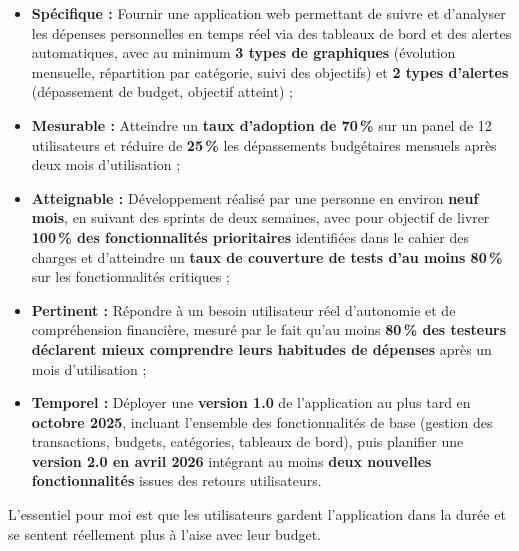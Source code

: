 \begin{tcolorbox}[colback=green!5!white,colframe=green!60!black,title=\textbf{Objectifs SMART du projet avec indicateurs de mesure}]
\begin{itemize}
    \item \textbf{Spécifique :} Fournir une application web permettant de suivre et d'analyser les dépenses personnelles en temps réel via des tableaux de bord et des alertes automatiques, avec au minimum \textbf{3 types de graphiques} (évolution mensuelle, répartition par catégorie, suivi des objectifs) et \textbf{2 types d'alertes} (dépassement de budget, objectif atteint) ;

    \item \textbf{Mesurable :} Atteindre un \textbf{taux d'adoption de 70\,\%} sur un panel de 12 utilisateurs et réduire de \textbf{25\,\%} les dépassements budgétaires mensuels après deux mois d'utilisation ;

    \item \textbf{Atteignable :} Développement réalisé par une personne en environ \textbf{neuf mois}, en suivant des sprints de deux semaines, avec pour objectif de livrer \textbf{100\,\% des fonctionnalités prioritaires} identifiées dans le cahier des charges et d'atteindre un \textbf{taux de couverture de tests d'au moins 80\,\%} sur les fonctionnalités critiques ;

    \item \textbf{Pertinent :} Répondre à un besoin utilisateur réel d'autonomie et de compréhension financière, mesuré par le fait qu'au moins \textbf{80\,\% des testeurs déclarent mieux comprendre leurs habitudes de dépenses} après un mois d'utilisation ;

    \item \textbf{Temporel :} Déployer une \textbf{version 1.0} de l'application au plus tard en \textbf{octobre 2025}, incluant l'ensemble des fonctionnalités de base (gestion des transactions, budgets, catégories, tableaux de bord), puis planifier une \textbf{version 2.0 en avril 2026} intégrant au moins \textbf{deux nouvelles fonctionnalités} issues des retours utilisateurs.
\end{itemize}

L'essentiel pour moi est que les utilisateurs gardent l'application dans la durée et se sentent réellement plus à l'aise avec leur budget.
\end{tcolorbox}


